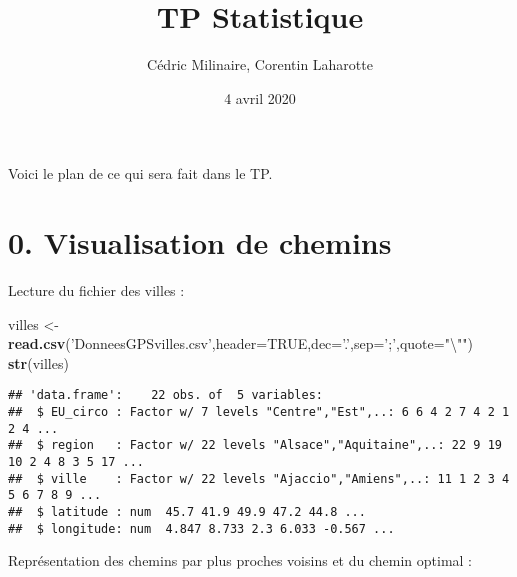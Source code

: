 \documentclass[]{article}
\title{TP Statistique}
\author{Cédric Milinaire, Corentin Laharotte}
\date{4 avril 2020}
\newenvironment{Shaded}{\begin{snugshade}}{\end{snugshade}}
\newcommand{\CharTok}[1]{\textcolor[rgb]{0.31,0.60,0.02}{#1}}
\newcommand{\DataTypeTok}[1]{\textcolor[rgb]{0.13,0.29,0.53}{#1}}
\newcommand{\KeywordTok}[1]{\textcolor[rgb]{0.13,0.29,0.53}{\textbf{#1}}}
\newcommand{\NormalTok}[1]{#1}
\newcommand{\OtherTok}[1]{\textcolor[rgb]{0.56,0.35,0.01}{#1}}
\newcommand{\StringTok}[1]{\textcolor[rgb]{0.31,0.60,0.02}{#1}}
\begin{document}
\maketitle

Voici le plan de ce qui sera fait dans le TP.

\hypertarget{visualisation-de-chemins}{%
\section{0. Visualisation de chemins}\label{visualisation-de-chemins}}

Lecture du fichier des villes :

\begin{Shaded}
\begin{Highlighting}[]
\NormalTok{villes <-}\StringTok{ }\KeywordTok{read.csv}\NormalTok{(}\StringTok{'DonneesGPSvilles.csv'}\NormalTok{,}\DataTypeTok{header=}\OtherTok{TRUE}\NormalTok{,}\DataTypeTok{dec=}\StringTok{'.'}\NormalTok{,}\DataTypeTok{sep=}\StringTok{';'}\NormalTok{,}\DataTypeTok{quote=}\StringTok{"}\CharTok{\textbackslash{}"}\StringTok{"}\NormalTok{)}
\KeywordTok{str}\NormalTok{(villes)}
\end{Highlighting}
\end{Shaded}

\begin{verbatim}
## 'data.frame':    22 obs. of  5 variables:
##  $ EU_circo : Factor w/ 7 levels "Centre","Est",..: 6 6 4 2 7 4 2 1 2 4 ...
##  $ region   : Factor w/ 22 levels "Alsace","Aquitaine",..: 22 9 19 10 2 4 8 3 5 17 ...
##  $ ville    : Factor w/ 22 levels "Ajaccio","Amiens",..: 11 1 2 3 4 5 6 7 8 9 ...
##  $ latitude : num  45.7 41.9 49.9 47.2 44.8 ...
##  $ longitude: num  4.847 8.733 2.3 6.033 -0.567 ...
\end{verbatim}

Représentation des chemins par plus proches voisins et du chemin optimal
:
\end{document}
